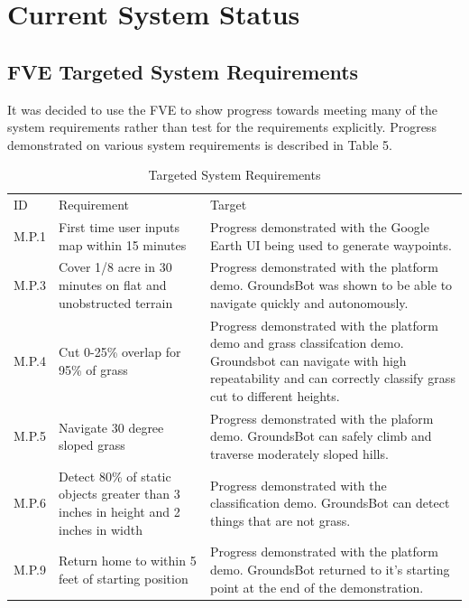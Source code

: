 \documentclass[12pt]{extarticle}
\begin{document}
\newpage
\section{Current System Status}
  \subsection{FVE Targeted System Requirements}
  It was decided to use the FVE to show progress towards meeting many of the system requirements rather than test for the requirements explicitly. Progress demonstrated on various system requirements is described in Table 5.
  
  \begin{center}
  \begin{table}[H]
  \caption{Targeted System Requirements}
  \label{table:targeted requirements}

  \def\arraystretch{1.5}
  	\begin{tabularx}{\textwidth}{ lXX }
  	  \hline

		\sffamily\normalsize{ID} & \sffamily\normalsize{Requirement} & \sffamily\normalsize{Target} \\

    M.P.1 & First time user inputs map within 15 minutes & Progress demonstrated with the Google Earth UI being used to generate waypoints.\\

    M.P.3 & Cover 1/8 acre in 30 minutes on flat and unobstructed terrain & Progress demonstrated with the platform demo. GroundsBot was shown to be able to navigate quickly and autonomously.\\

    M.P.4 & Cut 0-25\% overlap for 95\% of grass &  Progress demonstrated with the platform demo and grass classifcation demo. Groundsbot can navigate with high repeatability and can correctly classify grass cut to different heights.\\
    
    M.P.5 & Navigate 30 degree sloped grass & Progress demonstrated with the plaform demo. GroundsBot can safely climb and traverse moderately sloped hills.\\

    M.P.6 & Detect 80\% of static objects greater than 3 inches in height and 2 inches in width & Progress demonstrated with the classification demo. GroundsBot can detect things that are not grass.\\

    M.P.9 & Return home to within 5 feet of starting position & Progress demonstrated with the platform demo. GroundsBot returned to it's starting point at the end of the demonstration.\\
    

\end{tabularx}
\end{table}
\end{center}
\end{document}
